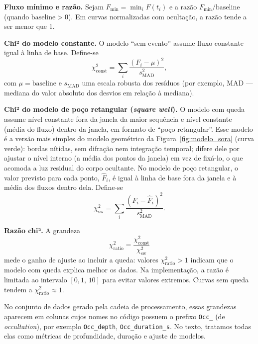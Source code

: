 \textbf{Fluxo mínimo e razão.} Sejam \(F_{\min} = \min_i F(t_i)\) e a razão \(F_{\min}/\mathrm{baseline}\) (quando \(\mathrm{baseline} > 0\)). Em curvas normalizadas com ocultação, a razão tende a ser menor que 1.

\textbf{Chi² do modelo constante.} O modelo ``sem evento'' assume fluxo constante igual à linha de base. Define-se
\begin{equation}
\chi^2_{\mathrm{const}} = \sum_i \frac{(F_i - \mu)^2}{s_{\mathrm{MAD}}^2},
\end{equation}
com \(\mu = \mathrm{baseline}\) e \(s_{\mathrm{MAD}}\) uma escala robusta dos resíduos (por exemplo, MAD --- mediana do valor absoluto dos desvios em relação à mediana).

\textbf{Chi² do modelo de poço retangular (\textit{square well}).} O modelo com queda assume nível constante fora da janela da maior sequência e nível constante (média do fluxo) dentro da janela, em formato de ``poço retangular''. Esse modelo é a versão mais simples do modelo geométrico da Figura~\ref{fig:modelo_sora} (curva verde): bordas nítidas, sem difração nem integração temporal; difere dele por ajustar o nível interno (a média dos pontos da janela) em vez de fixá-lo, o que acomoda a luz residual do corpo ocultante. No modelo de poço retangular, o valor previsto para cada ponto, \(\hat{F}_i\), é igual à linha de base fora da janela e à média dos fluxos dentro dela. Define-se
\begin{equation}
\chi^2_{\mathrm{sw}} = \sum_i \frac{(F_i - \hat{F}_i)^2}{s_{\mathrm{MAD}}^2}.
\end{equation}

\textbf{Razão chi².} A grandeza
\begin{equation}
\chi^2_{\mathrm{ratio}} = \frac{\chi^2_{\mathrm{const}}}{\chi^2_{\mathrm{sw}}}
\end{equation}
mede o ganho de ajuste ao incluir a queda: valores \(\chi^2_{\mathrm{ratio}} > 1\) indicam que o modelo com queda explica melhor os dados. Na implementação, a razão é limitada ao intervalo \([0{,}1,\, 10]\) para evitar valores extremos. Curvas sem queda tendem a \(\chi^2_{\mathrm{ratio}} \approx 1\).

No conjunto de dados gerado pela cadeia de processamento, essas grandezas aparecem em colunas cujos nomes no código possuem o prefixo \texttt{Occ\_} (de \textit{occultation}), por exemplo \texttt{Occ\_depth}, \texttt{Occ\_duration\_s}. No texto, tratamos todas elas como métricas de profundidade, duração e ajuste de modelos.

